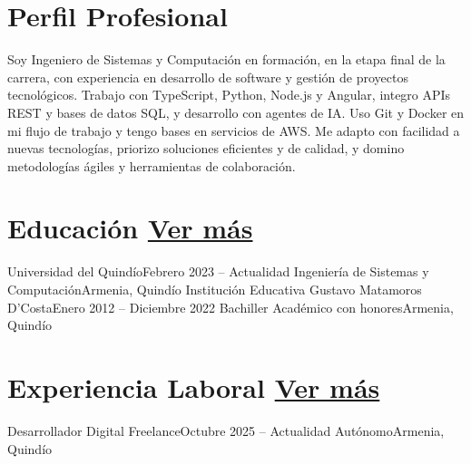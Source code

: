 \documentclass[letterpaper,12pt]{fed-res}
\begin{document}


\section{Perfil Profesional}
Soy Ingeniero de Sistemas y Computación en formación, en la etapa final de la carrera, con experiencia en desarrollo de software y gestión de proyectos tecnológicos. Trabajo con TypeScript, Python, Node.js y Angular, integro APIs REST y bases de datos SQL, y desarrollo con agentes de IA. Uso Git y Docker en mi flujo de trabajo y tengo bases en servicios de AWS. Me adapto con facilidad a nuevas tecnologías, priorizo soluciones eficientes y de calidad, y domino metodologías ágiles y herramientas de colaboración.

\section{Educación \hfill \href{\urlEducationEs}{Ver más}}
\resumeSubHeadingListStart
    \resumeSubheading
        {Universidad del Quindío}{Febrero 2023 -- Actualidad}
        {Ingeniería de Sistemas y Computación}{Armenia, Quindío}
    \resumeSubheading
        {Institución Educativa Gustavo Matamoros D'Costa}{Enero 2012 -- Diciembre 2022}
        {Bachiller Académico con honores}{Armenia, Quindío}
\resumeSubHeadingListEnd

\section{Experiencia Laboral \hfill \href{\urlWorkEs}{Ver más}}
\resumeSubHeadingListStart
    \resumeSubheading
        {Desarrollador Digital Freelance}{Octubre 2025 -- Actualidad}
        {Autónomo}{Armenia, Quindío}
        \resumeItemListStart
        \resumeItemListEnd
\end{document}
